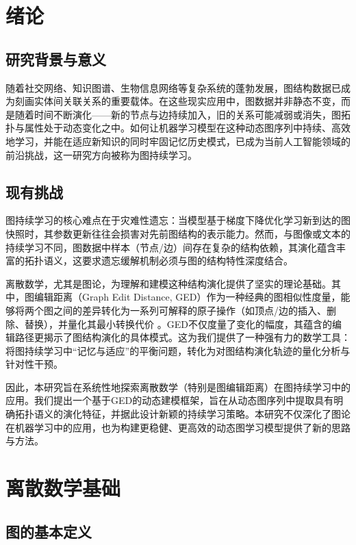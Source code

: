 \chapter{绪论}

\section{研究背景与意义}
随着社交网络、知识图谱、生物信息网络等复杂系统的蓬勃发展，图结构数据已成为刻画实体间关联关系的重要载体。在这些现实应用中，图数据并非静态不变，而是随着时间不断演化——新的节点与边持续加入，旧的关系可能减弱或消失，图拓扑与属性处于动态变化之中。如何让机器学习模型在这种动态图序列中持续、高效地学习，并能在适应新知识的同时牢固记忆历史模式，已成为当前人工智能领域的前沿挑战，这一研究方向被称为图持续学习。

\section{现有挑战}

图持续学习的核心难点在于灾难性遗忘：当模型基于梯度下降优化学习新到达的图快照时，其参数更新往往会损害对先前图结构的表示能力。然而，与图像或文本的持续学习不同，图数据中样本（节点/边）间存在复杂的结构依赖，其演化蕴含丰富的拓扑语义，这要求遗忘缓解机制必须与图的结构特性深度结合。

离散数学，尤其是图论，为理解和建模这种结构演化提供了坚实的理论基础。其中，图编辑距离（Graph Edit Distance, GED）作为一种经典的图相似性度量，能够将两个图之间的差异转化为一系列可解释的原子操作（如顶点/边的插入、删除、替换），并量化其最小转换代价 \cite{blumenthal2020exact}。GED不仅度量了变化的幅度，其蕴含的编辑路径更揭示了图结构演化的具体模式。这为我们提供了一种强有力的数学工具：将图持续学习中“记忆与适应”的平衡问题，转化为对图结构演化轨迹的量化分析与针对性干预。

因此，本研究旨在系统性地探索离散数学（特别是图编辑距离）在图持续学习中的应用。我们提出一个基于GED的动态建模框架，旨在从动态图序列中提取具有明确拓扑语义的演化特征，并据此设计新颖的持续学习策略。本研究不仅深化了图论在机器学习中的应用，也为构建更稳健、更高效的动态图学习模型提供了新的思路与方法。

\chapter{离散数学基础}

\section{图的基本定义}

